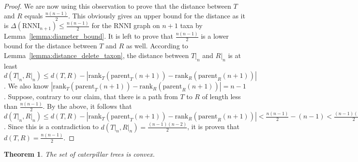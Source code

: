 \documentclass{amsart}
\newcommand{\parent}{\mathrm{parent}}
\newcommand{\rank}{\mathrm{rank}}
\newcommand{\rnni}{\mathrm{RNNI}}
\newtheorem{theorem}[definition]{Theorem}
\begin{document}
\begin{proof}
We are now using this observation to prove that the distance between $T$ and $R$ equals $\frac{n(n-1)}{2}$.
This obviously gives an upper bound for the distance as it is $\Delta(\rnni_{n+1}) \leq \frac{n(n-1)}{2}$ for the $\rnni$ graph on $n+1$ taxa by Lemma~\ref{lemma:diameter_bound}.
It is left to prove that $\frac{n(n-1)}{2}$ is a lower bound for the distance between $T$ and $R$ as well.
According to Lemma~\ref{lemma:distance_delete_taxon}, the distance between $T{\big|}_n$ and $R{\big|}_n$ is at least $d(T{\big|}_n, R{\big|}_n) \leq d(T,R) - |\rank_T(\parent_T(n+1)) - \rank_R(\parent_R(n+1))|$.
We also know $|\rank_T(\parent_T(n+1)) - \rank_R(\parent_R(n+1))| = n-1$.
Suppose, contrary to our claim, that there is a path from $T$ to $R$ of length less than $\frac{n(n-1)}{2}$.
By the above, it follows that $d(T{\big|}_n, R{\big|}_n) \leq d(T,R) - |\rank_T(\parent_T(n+1)) - \rank_R(\parent_R(n+1))| < \frac{n(n-1)}{2} - (n-1) < \frac{(n-1)(n-2)}{2}$.
Since this is a contradiction to $d(T{\big|}_n, R{\big|}_n) = \frac{(n-1)(n-2)}{2}$, it is proven that $d(T,R) = \frac{n(n-1)}{2} $.
\end{proof}

\begin{theorem}
The set of caterpillar trees is convex.
\label{thm:caterpillar_convex}
\end{theorem}
\end{document}
